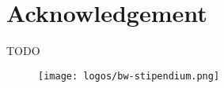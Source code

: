 \chapter*{Acknowledgement}

TODO

\begin{figure}[h]
    \centering
\end{figure}

\begin{figure}[h]
    \centering
    \texttt{[image: logos/bw-stipendium.png]} 
\end{figure}